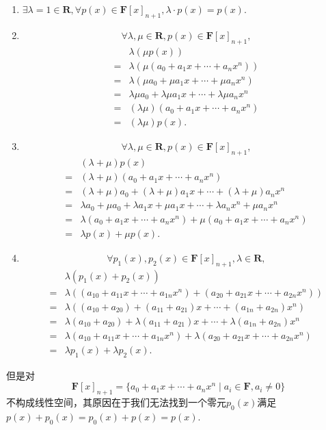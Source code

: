 \begin{solution}
\begin{enumerate}
\begin{enumerate}
                    \item $\exists \lambda = 1 \in \mathbf{R},\forall p(x) \in \mathbf{F}[x]_{n+1}, \lambda \cdot p(x) = p(x)$.

                    \item \[\forall \lambda, \mu \in \mathbf{R}, p(x) \in \mathbf{F}[x]_{n+1},\]
                    \begin{align*}
                        & \lambda(\mu p(x)) \\ ={} & \lambda(\mu(a_0 + a_1x + \cdots + a_nx^n)) \\ ={} & \lambda(\mu a_0 + \mu a_1x + \cdots + \mu a_nx^n) \\ ={} & \lambda \mu a_0 + \lambda \mu a_1x + \cdots + \lambda \mu a_nx^n \\ ={} & (\lambda \mu) (a_0 + a_1x + \cdots + a_nx^n) \\ ={} & (\lambda \mu)p(x).
                    \end{align*}

                    \item \[\forall \lambda, \mu \in \mathbf{R}, p(x) \in \mathbf{F}[x]_{n+1},\]
                    \begin{align*}
                        & (\lambda + \mu) p(x) \\ ={} & (\lambda + \mu)(a_0 + a_1x + \cdots + a_nx^n) \\ ={} & (\lambda + \mu)a_0 + (\lambda + \mu)a_1x + \cdots + (\lambda + \mu)a_nx^n \\ ={} & \lambda a_0 + \mu a_0 + \lambda a_1x + \mu a_1x+ \cdots + \lambda a_nx^n + \mu a_nx^n \\ ={} & \lambda(a_0 + a_1x + \cdots + a_nx^n) + \mu(a_0 + a_1x + \cdots + a_nx^n) \\ ={} & \lambda p(x) + \mu p(x).
                    \end{align*}

                    \item \[\forall p_1(x), p_2(x) \in \mathbf{F}[x]_{n+1}, \lambda \in \mathbf{R},\]
                    \begin{align*}
                        & \lambda(p_1(x) + p_2(x)) \\ ={} & \lambda((a_{10} + a_{11}x + \cdots + a_{1n}x^n) + (a_{20} + a_{21}x + \cdots + a_{2n}x^n)) \\ ={} & \lambda((a_{10} + a_{20}) + (a_{11} + a_{21})x + \cdots + (a_{1n} + a_{2n})x^n) \\ ={} & \lambda(a_{10} + a_{20}) + \lambda(a_{11} + a_{21})x + \cdots + \lambda(a_{1n} + a_{2n})x^n \\ ={} & \lambda(a_{10} + a_{11}x + \cdots + a_{1n}x^n) + \lambda(a_{20} + a_{21}x + \cdots + a_{2n}x^n) \\ ={} & \lambda p_1(x) + \lambda p_2(x).
                    \end{align*}
                \end{enumerate}
            但是对\[\mathbf{F}[x]_{n+1}=\{a_0+a_1x+\cdots+a_nx^n \mid a_i\in\mathbf{F},a_i\neq 0\}\]不构成线性空间，其原因在于我们无法找到一个零元$p_0(x)$满足$p(x) + p_0(x) = p_0(x) + p(x) = p(x)$.


\end{enumerate}
\end{solution}
